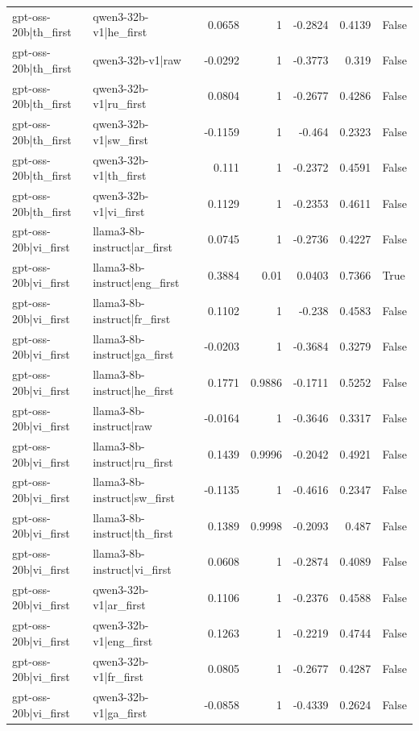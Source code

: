 \begin{table}
\begin{tabular}{l l r r r r l}
gpt-oss-20b|th_first & qwen3-32b-v1|he_first & 0.0658 & 1 & -0.2824 & 0.4139 & False \\
gpt-oss-20b|th_first & qwen3-32b-v1|raw & -0.0292 & 1 & -0.3773 & 0.319 & False \\
gpt-oss-20b|th_first & qwen3-32b-v1|ru_first & 0.0804 & 1 & -0.2677 & 0.4286 & False \\
gpt-oss-20b|th_first & qwen3-32b-v1|sw_first & -0.1159 & 1 & -0.464 & 0.2323 & False \\
gpt-oss-20b|th_first & qwen3-32b-v1|th_first & 0.111 & 1 & -0.2372 & 0.4591 & False \\
gpt-oss-20b|th_first & qwen3-32b-v1|vi_first & 0.1129 & 1 & -0.2353 & 0.4611 & False \\
gpt-oss-20b|vi_first & llama3-8b-instruct|ar_first & 0.0745 & 1 & -0.2736 & 0.4227 & False \\
gpt-oss-20b|vi_first & llama3-8b-instruct|eng_first & 0.3884 & 0.01 & 0.0403 & 0.7366 & True \\
gpt-oss-20b|vi_first & llama3-8b-instruct|fr_first & 0.1102 & 1 & -0.238 & 0.4583 & False \\
gpt-oss-20b|vi_first & llama3-8b-instruct|ga_first & -0.0203 & 1 & -0.3684 & 0.3279 & False \\
gpt-oss-20b|vi_first & llama3-8b-instruct|he_first & 0.1771 & 0.9886 & -0.1711 & 0.5252 & False \\
gpt-oss-20b|vi_first & llama3-8b-instruct|raw & -0.0164 & 1 & -0.3646 & 0.3317 & False \\
gpt-oss-20b|vi_first & llama3-8b-instruct|ru_first & 0.1439 & 0.9996 & -0.2042 & 0.4921 & False \\
gpt-oss-20b|vi_first & llama3-8b-instruct|sw_first & -0.1135 & 1 & -0.4616 & 0.2347 & False \\
gpt-oss-20b|vi_first & llama3-8b-instruct|th_first & 0.1389 & 0.9998 & -0.2093 & 0.487 & False \\
gpt-oss-20b|vi_first & llama3-8b-instruct|vi_first & 0.0608 & 1 & -0.2874 & 0.4089 & False \\
gpt-oss-20b|vi_first & qwen3-32b-v1|ar_first & 0.1106 & 1 & -0.2376 & 0.4588 & False \\
gpt-oss-20b|vi_first & qwen3-32b-v1|eng_first & 0.1263 & 1 & -0.2219 & 0.4744 & False \\
gpt-oss-20b|vi_first & qwen3-32b-v1|fr_first & 0.0805 & 1 & -0.2677 & 0.4287 & False \\
gpt-oss-20b|vi_first & qwen3-32b-v1|ga_first & -0.0858 & 1 & -0.4339 & 0.2624 & False \\

\end{tabular}
\end{table}
